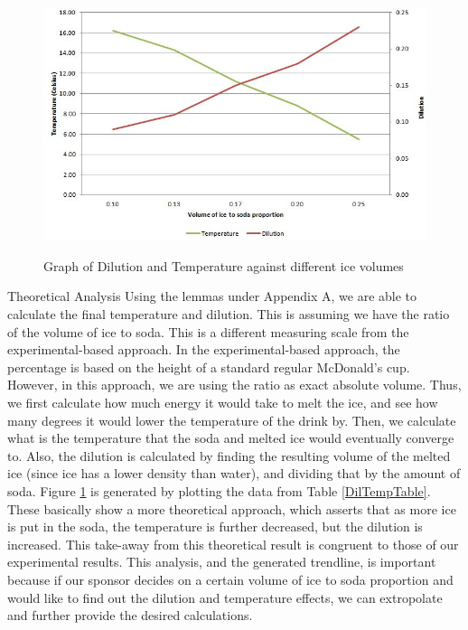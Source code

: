 \documentclass[oneside,12pt]{report}
\begin{document}
\begin{figure}
	\centering
	\caption{Graph of Dilution and Temperature against different ice volumes}
	\includegraphics[width=\textwidth]{extra/Graph.jpg}
\label{DilTempGraph}
\end{figure}

\vspace{12pt}

\noindent Theoretical Analysis
\vspace{12pt}
\newline
Using the lemmas under Appendix A, we are able to calculate the final temperature and dilution. This is assuming we have the ratio of the volume of ice to soda. This is a different measuring scale from the experimental-based approach. In the experimental-based approach, the percentage is based on the height of a standard regular McDonald's cup. However, in this approach, we are using the ratio as exact absolute volume. Thus, we first calculate how much energy it would take to melt the ice, and see how many degrees it would lower the temperature of the drink by. Then, we calculate what is the temperature that the soda and melted ice would eventually converge to. Also, the dilution is calculated by finding the resulting volume of the melted ice (since ice has a lower density than water), and dividing that by the amount of soda.
\vspace{12pt}
\newline
Figure \ref{DilTempGraph} is generated by plotting the data from Table \ref{DilTempTable}. These basically show a more theoretical approach, which asserts that as more ice is put in the soda, the temperature is further decreased, but the dilution is increased. This take-away from this theoretical result is congruent to those of our experimental results.  This analysis, and the generated trendline, is important because if our sponsor decides on a certain volume of ice to soda proportion and would like to find out the dilution and temperature effects, we can extropolate and further provide the desired calculations. 
\end{document}
